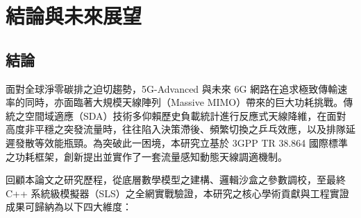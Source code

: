 
\section{結論與未來展望}

\subsection{結論}
面對全球淨零碳排之迫切趨勢，5G-Advanced 與未來 6G 網路在追求極致傳輸速率的同時，亦面臨著大規模天線陣列（Massive MIMO）帶來的巨大功耗挑戰。傳統之空間域適應（SDA）技術多仰賴歷史負載統計進行反應式天線降維，在面對高度非平穩之突發流量時，往往陷入決策滯後、頻繁切換之乒乓效應，以及排隊延遲發散等效能瓶頸。為突破此一困境，本研究立基於 3GPP TR 38.864 國際標準之功耗框架，創新提出並實作了一套流量感知動態天線調適機制。

回顧本論文之研究歷程，從底層數學模型之建構、邏輯沙盒之參數調校，至最終 C++ 系統級模擬器（SLS）之全網實戰驗證，本研究之核心學術貢獻與工程實證成果可歸納為以下四大維度：

